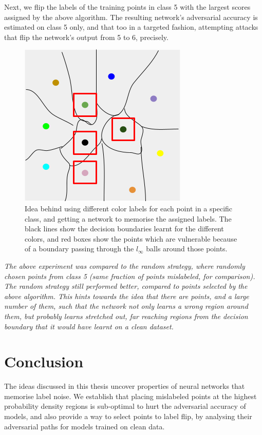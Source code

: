 \documentclass{ociamthesis}
\begin{document}
Next, we flip the labels of the training points in class 5 with the largest
scores assigned by the above algorithm. The resulting network's adversarial
accuracy is estimated on class 5 only, and that too in a targeted fashion,
attempting attacks that flip the network's output from 5 to 6, precisely.

\begin{figure}
    \centering
    \includegraphics[scale=0.4, trim={0 0 0 0}, clip]{thesis-coloring-trick.png}
    \caption{Idea behind using different color labels for each point in a
    specific class, and getting a network to memorise the assigned labels. The
    black lines show the decision boundaries learnt for the different colors,
    and red boxes show the points which are vulnerable because of a boundary
    passing through the $l_\infty$ balls around those points.}
\end{figure}

\emph{The above experiment was compared to the random strategy, where randomly
chosen points from class 5 (same fraction of points mislabeled, for comparison).
The random strategy still performed better, compared to points selected by the
above algorithm. This hints towards the idea that there are points, and a large
number of them, such that the network not only learns a wrong region around
them, but probably learns stretched out, far reaching regions from the decision
boundary that it would have learnt on a clean dataset.}



\chapter{Conclusion}
The ideas discussed in this thesis uncover properties of neural networks that
memorise label noise. We establish that placing mislabeled points at the highest
probability density regions is sub-optimal to hurt the adversarial accuracy of
models, and also provide a way to select points to label flip, by analysing
their adversarial paths for models trained on clean data.
\end{document}
